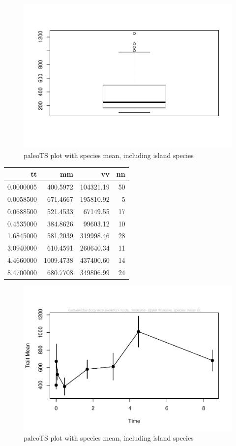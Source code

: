 \documentclass[]{article}
\begin{document}
\begin{figure}[htbp]
\centering
\includegraphics{MA_JJ_files/figure-latex/paleoTS plot with species mean, including island species-1.pdf}
\caption{paleoTS plot with species mean, including island species}
\end{figure}

\begin{longtable}[]{@{}rrrr@{}}
\toprule
tt & mm & vv & nn\tabularnewline
\midrule
\endhead
0.0000005 & 400.5972 & 104321.19 & 50\tabularnewline
0.0058500 & 671.4667 & 195810.92 & 5\tabularnewline
0.0688500 & 521.4533 & 67149.55 & 17\tabularnewline
0.4535000 & 384.8626 & 99603.12 & 10\tabularnewline
1.6845000 & 581.2039 & 319998.46 & 28\tabularnewline
3.0940000 & 610.4591 & 260640.34 & 11\tabularnewline
4.4660000 & 1009.4738 & 437400.60 & 14\tabularnewline
8.4700000 & 680.7708 & 349806.99 & 24\tabularnewline
\bottomrule
\end{longtable}

\begin{figure}[htbp]
\centering
\includegraphics{MA_JJ_files/figure-latex/paleoTS plot with species mean, including island species-2.pdf}
\caption{paleoTS plot with species mean, including island species}
\end{figure}
\end{document}
